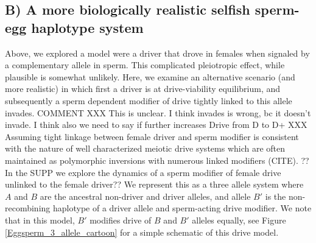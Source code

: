 \documentclass[12pt,letterpaper]{article}
\newcommand{\yb}[1]{{ \color{blue} #1}}
\begin{document}
\subsection*{B) A more biologically realistic selfish sperm-egg haplotype system}
Above, we explored a model were a driver that drove in females when signaled by a complementary allele in sperm.  
This complicated pleiotropic effect, while plausible is somewhat unlikely. 
Here, we examine an alternative scenario (and more realistic) in which first a driver is at drive-viability equilibrium,
	and subsequently a sperm dependent modifier of drive tightly linked to this allele invades.
	\yb{COMMENT XXX This is unclear. I think invades is wrong, bc it doesn't invade.  I think also we need to say if further increases Drive from D to D+ XXX }
\yb{Assuming tight linkage between female driver and sperm modifier is consistent with the nature of well characterized meiotic drive systems 
	which are often maintained as polymorphic inversions with numerous linked modifiers (CITE).}
\yb{??In the SUPP we explore the dynamics of a sperm modifier of female drive unlinked to the female driver??} 
We represent this as a three allele system where $A$ and $B$ are the ancestral non-driver and driver alleles, 
	and allele $B'$ is the non-recombining haplotype of a driver allele and sperm-acting drive modifier. 
	We note that in this model, $B'$ modifies drive of $B$ and $B'$ alleles equally, see Figure \ref{Eggsperm_3_allele_cartoon} for a simple schematic of this drive model.  
\end{document}
